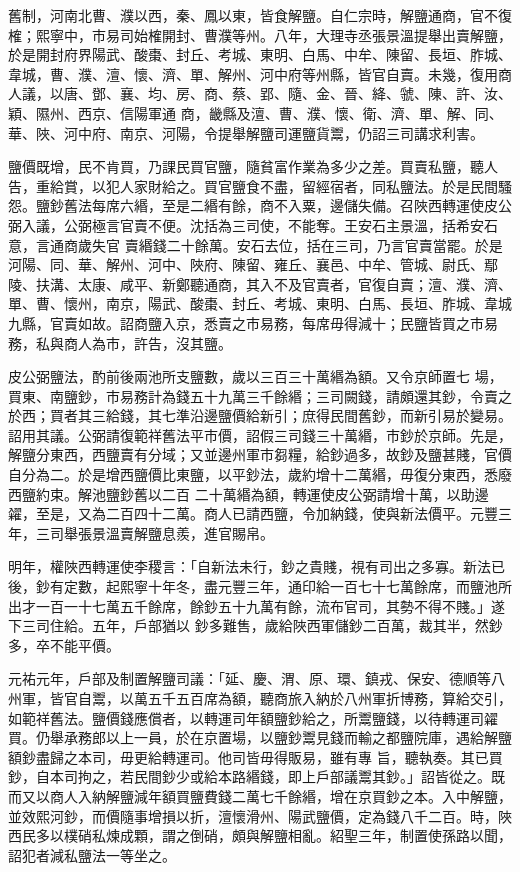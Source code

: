 \begin{pinyinscope}
 舊制，河南北曹、濮以西，秦、鳳以東，皆食解鹽。自仁宗時，解鹽通商，官不復榷；熙寧中，市易司始榷開封、曹濮等州。八年，大理寺丞張景溫提舉出賣解鹽，於是開封府界陽武、酸棗、封丘、考城、東明、白馬、中牟、陳留、長垣、胙城、韋城，曹、濮、澶、懷、濟、單、解州、河中府等州縣，皆官自賣。未幾，復用商人議，以唐、鄧、襄、均、房、商、蔡、郢、隨、金、晉、絳、虢、陳、許、汝、穎、隰州、西京、信陽軍通
 商，畿縣及澶、曹、濮、懷、衛、濟、單、解、同、華、陜、河中府、南京、河陽，令提舉解鹽司運鹽貨鬻，仍詔三司講求利害。



 鹽價既增，民不肯買，乃課民買官鹽，隨貧富作業為多少之差。買賣私鹽，聽人告，重給賞，以犯人家財給之。買官鹽食不盡，留經宿者，同私鹽法。於是民間騷怨。鹽鈔舊法每席六緡，至是二緡有餘，商不入粟，邊儲失備。召陜西轉運使皮公弼入議，公弼極言官賣不便。沈括為三司使，不能奪。王安石主景溫，括希安石意，言通商歲失官
 賣緡錢二十餘萬。安石去位，括在三司，乃言官賣當罷。於是河陽、同、華、解州、河中、陜府、陳留、雍丘、襄邑、中牟、管城、尉氏、鄢陵、扶溝、太康、咸平、新鄭聽通商，其入不及官賣者，官復自賣；澶、濮、濟、單、曹、懷州，南京，陽武、酸棗、封丘、考城、東明、白馬、長垣、胙城、韋城九縣，官賣如故。詔商鹽入京，悉賣之市易務，每席毋得減十；民鹽皆買之市易務，私與商人為市，許告，沒其鹽。



 皮公弼鹽法，酌前後兩池所支鹽數，歲以三百三十萬緡為額。又令京師置七
 場，買東、南鹽鈔，市易務計為錢五十九萬三千餘緡；三司闕錢，請頗還其鈔，令賣之於西；買者其三給錢，其七準沿邊鹽價給新引；庶得民間舊鈔，而新引易於變易。詔用其議。公弼請復範祥舊法平市價，詔假三司錢三十萬緡，市鈔於京師。先是，解鹽分東西，西鹽賣有分域；又並邊州軍市芻糧，給鈔過多，故鈔及鹽甚賤，官價自分為二。於是增西鹽價比東鹽，以平鈔法，歲約增十二萬緡，毋復分東西，悉廢西鹽約束。解池鹽鈔舊以二百
 二十萬緡為額，轉運使皮公弼請增十萬，以助邊糴，至是，又為二百四十二萬。商人已請西鹽，令加納錢，使與新法價平。元豐三年，三司舉張景溫賣解鹽息羨，進官賜帛。



 明年，權陜西轉運使李稷言：「自新法未行，鈔之貴賤，視有司出之多寡。新法已後，鈔有定數，起熙寧十年冬，盡元豐三年，通印給一百七十七萬餘席，而鹽池所出才一百一十七萬五千餘席，餘鈔五十九萬有餘，流布官司，其勢不得不賤。」遂下三司住給。五年，戶部猶以
 鈔多難售，歲給陜西軍儲鈔二百萬，裁其半，然鈔多，卒不能平價。



 元祐元年，戶部及制置解鹽司議：「延、慶、渭、原、環、鎮戎、保安、德順等八州軍，皆官自鬻，以萬五千五百席為額，聽商旅入納於八州軍折博務，算給交引，如範祥舊法。鹽價錢應償者，以轉運司年額鹽鈔給之，所鬻鹽錢，以待轉運司糴買。仍舉承務郎以上一員，於在京置場，以鹽鈔鬻見錢而輸之都鹽院庫，遇給解鹽額鈔盡歸之本司，毋更給轉運司。他司皆毋得販易，雖有專
 旨，聽執奏。其已買鈔，自本司拘之，若民間鈔少或給本路緡錢，即上戶部議鬻其鈔。」詔皆從之。既而又以商人入納解鹽減年額買鹽費錢二萬七千餘緡，增在京買鈔之本。入中解鹽，並效熙河鈔，而價隨事增損以折，澶懷滑州、陽武鹽價，定為錢八千二百。時，陜西民多以樸硝私煉成顆，謂之倒硝，頗與解鹽相亂。紹聖三年，制置使孫路以聞，詔犯者減私鹽法一等坐之。




\end{pinyinscope}
